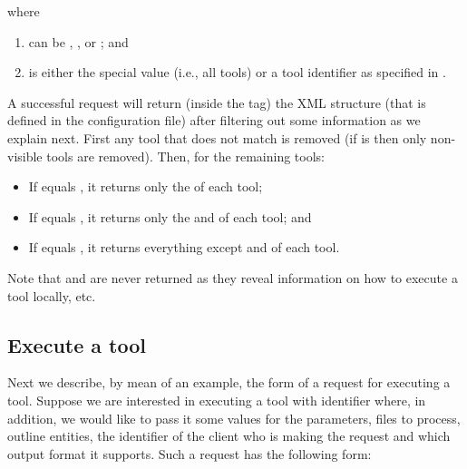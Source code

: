 \bigskip
\noindent
where 
\begin{enumerate}
%
\item {} can be ,
  , or ; and
%
\item {} is either the special value 
  (i.e., all tools) or a tool identifier as specified in
  .
%
\end{enumerate}
%
A successful request will return (inside the  tag) the
XML structure  (that is defined in the
configuration file) after filtering out some information as we explain
next.
%
First any tool that does not match  is removed (if  is
 then only non-visible tools are
removed). Then, for the remaining tools:
%
\begin{itemize}
%
\item If  equals , it returns only
  the  of each tool;
%
\item If  equals , it returns
  only the  and
   of each tool; and
%
\item If  equals , it returns
  everything except  and
   of each tool.
%
\end{itemize}
%
Note that  and
 are never returned as they reveal
information on how to execute a tool locally, etc.



\subsection{Execute a tool}
\label{sec:server:access:exectool}

Next we describe, by mean of an example, the form of a request for
executing a tool. Suppose we are interested in executing a tool with
identifier  where, in addition, we would like to pass it
some values for the parameters, files to process, outline entities,
the identifier of the client who is making the request and which
output format it supports.
%
Such a request has the following form:

